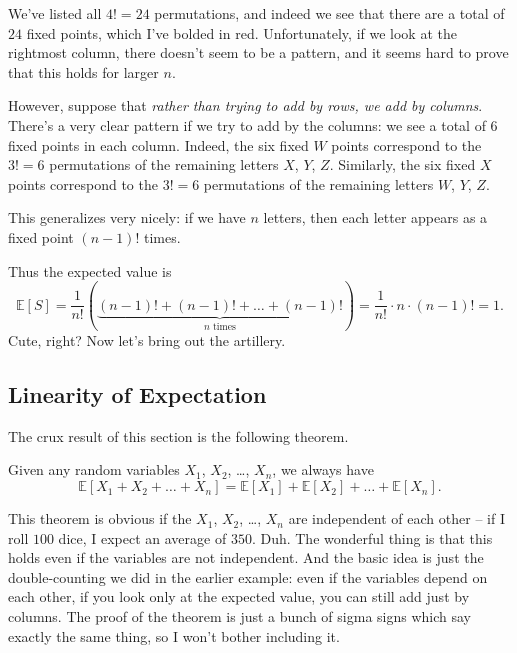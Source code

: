\documentclass[11pt]{scrartcl}
\newcommand\EE{\mathbb E}
\begin{document}
We've listed all $4! = 24$ permutations, and indeed we see that
there are a total of $24$ fixed points, which I've bolded in red.
Unfortunately, if we look at the rightmost column, there doesn't seem to
be a pattern, and it seems hard to prove that this holds for larger $n$.

However, suppose that
\emph{rather than trying to add by rows, we add by columns}.
There's a very clear pattern if we try to add by the columns:
we see a total of $6$ fixed points in each column.
Indeed, the six fixed $W$ points correspond to the $3!=6$ permutations
of the remaining letters $X$, $Y$, $Z$.
Similarly, the six fixed $X$ points correspond to the $3!=6$ permutations
of the remaining letters $W$, $Y$, $Z$.

This generalizes very nicely: if we have $n$ letters,
then each letter appears as a fixed point $(n-1)!$ times.

Thus the expected value is
\[ \EE[S] =
  \frac{1}{n!}
  \left( \underbrace{(n-1)! + (n-1)! + \dots + (n-1)!}_{\text{$n$ times}} \right)
  = \frac{1}{n!} \cdot n \cdot (n-1)! = 1. \]
Cute, right? Now let's bring out the artillery.

\subsection{Linearity of Expectation}
The crux result of this section is the following theorem.
\begin{theorem}
  Given any random variables $X_1$, $X_2$, \dots, $X_n$, we always have
  \[ \EE[X_1 + X_2 + \dots + X_n]
    = \EE[X_1]
    + \EE[X_2]
    + \dots
    + \EE[X_n].
  \]
\end{theorem}
This theorem is obvious if the $X_1$, $X_2$, \dots, $X_n$ are independent of each other
-- if I roll $100$ dice, I expect an average of $350$. Duh.
The wonderful thing is that this holds even if the variables are not independent.
And the basic idea is just the double-counting we did in the earlier example: even if the variables
depend on each other, if you look only at the expected value, you can still add just by columns.
The proof of the theorem is just a bunch of sigma signs which say exactly the same thing, so
I won't bother including it.
\end{document}
